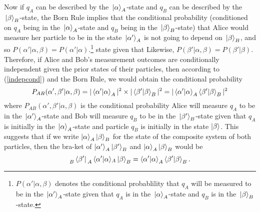 Now if $q_A$ can be described by the $\ket*{\alpha}_A$-state and $q_B$ can be described by the $\ket*{\beta}_B$-state, the Born Rule implies that the conditional probability (conditioned on $q_A$ being in the $\ket*{\alpha}_A$-state and $q_B$ being in the $\ket*{\beta}_B$-state) that Alice would measure her particle to be in the state $\ket*{\alpha'}_A$ is not going to depend on $\ket*{\beta}_B$,  and so  $P(\alpha'|\alpha, \beta)=P(\alpha'|\alpha)$.\footnote{ $P(\alpha'|\alpha, \beta)$ denotes the conditional probablility that $q_A$ will be measured to be in the $\ket*{\alpha'}_A$-state given that $q_A$ is in the $\ket*{\alpha}_A$-state and $q_B$ is in the $\ket*{\beta}_B$-state.} state given that Likewise, $P(\beta'|\alpha, \beta)=P(\beta'|\beta)$. 
Therefore, if Alice and Bob's measurement outcomes are conditionally independent given the prior states of their particles, then according to (\ref{indepcond}) and the Born Rule, we would obtain the conditional probability
\begin{equation}\label{indepprob}
    P_{AB}(\alpha', \beta'|\alpha, \beta)=|\ip{\alpha'}{\alpha}_A|^2\times|\ip{\beta'}{\beta}_B|^2=|\ip{\alpha'}{\alpha}_A\ip{\beta'}{\beta}_B|^2
\end{equation}
where $P_{AB}(\alpha', \beta'|\alpha, \beta)$ is the conditional probability Alice will measure $q_A$ to be in the $\ket*{\alpha'}_A$-state and Bob will measure $q_B$ to be in the $\ket*{\beta'}_B$-state given that $q_A$ is initially in the $\ket*{\alpha}_A$-state and particle $q_B$ is initially in the state $\ket{\beta}$.%
%
This suggests that if we write $\ket{\alpha}_A\ket{\beta}_B$ %
%
for the state of the composite system of both particles, then the bra-ket of $\ket{\alpha'}_A\ket{\beta'}_B$ and $\ket{\alpha}_A\ket{\beta}_B$ 
would be
\begin{equation}\label{innerprod}
    \prescript{}{B}{ \bra*{\beta'}}\prescript{}{A}{\ip*{\alpha'}{\alpha}}_A\ket*{\beta}_B=\ip{\alpha'}{\alpha}_A\ip{\beta'}{\beta}_B.
\end{equation} %
